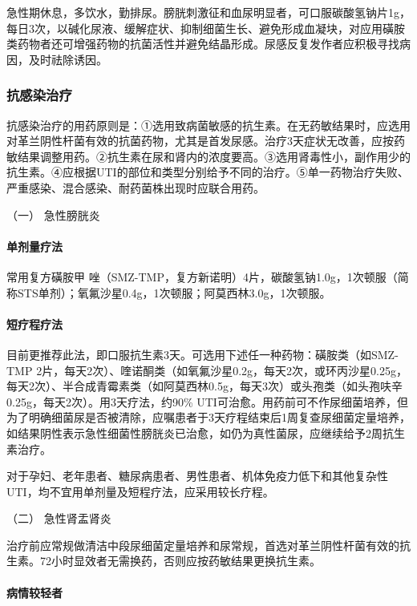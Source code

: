 急性期休息，多饮水，勤排尿。膀胱刺激征和血尿明显者，可口服碳酸氢钠片1g，每日3次，以碱化尿液、缓解症状、抑制细菌生长、避免形成血凝块，对应用磺胺类药物者还可增强药物的抗菌活性并避免结晶形成。尿感反复发作者应积极寻找病因，及时祛除诱因。

\subsubsection{抗感染治疗}

抗感染治疗的用药原则是：①选用致病菌敏感的抗生素。在无药敏结果时，应选用对革兰阴性杆菌有效的抗菌药物，尤其是首发尿感。治疗3天症状无改善，应按药敏结果调整用药。②抗生素在尿和肾内的浓度要高。③选用肾毒性小，副作用少的抗生素。④应根据UTI的部位和类型分别给予不同的治疗。⑤单一药物治疗失败、严重感染、混合感染、耐药菌株出现时应联合用药。

\hypertarget{text00345.htmlux5cux23CHP13-6-3-2-1}{}
（一） 急性膀胱炎

\paragraph{单剂量疗法}

常用复方磺胺甲{}
唑（SMZ-TMP，复方新诺明）4片，碳酸氢钠1.0g，1次顿服（简称STS单剂）；氧氟沙星0.4g，1次顿服；阿莫西林3.0g，1次顿服。

\paragraph{短疗程疗法}

目前更推荐此法，即口服抗生素3天。可选用下述任一种药物：磺胺类（如SMZ-TMP
2片，每天2次）、喹诺酮类（如氧氟沙星0.2g，每天2次，或环丙沙星0.25g，每天2次）、半合成青霉素类（如阿莫西林0.5g，每天3次）或头孢类（如头孢呋辛0.25g，每天2次）。用3天疗法，约90\%
UTI可治愈。用药前可不作尿细菌培养，但为了明确细菌尿是否被清除，应嘱患者于3天疗程结束后1周复查尿细菌定量培养，如结果阴性表示急性细菌性膀胱炎已治愈，如仍为真性菌尿，应继续给予2周抗生素治疗。

对于孕妇、老年患者、糖尿病患者、男性患者、机体免疫力低下和其他复杂性UTI，均不宜用单剂量及短程疗法，应采用较长疗程。

\hypertarget{text00345.htmlux5cux23CHP13-6-3-2-2}{}
（二） 急性肾盂肾炎

治疗前应常规做清洁中段尿细菌定量培养和尿常规，首选对革兰阴性杆菌有效的抗生素。72小时显效者无需换药，否则应按药敏结果更换抗生素。

\paragraph{病情较轻者}

